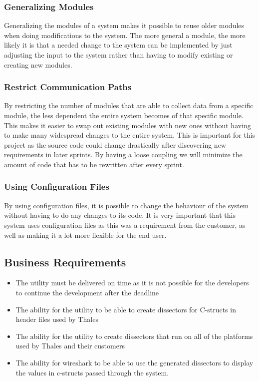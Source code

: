\subsubsection{Generalizing Modules}
Generalizing the modules of a system makes it possible to reuse older modules when doing modifications to the system. The more general a module, the more likely it is that a needed change to the system can be implemented by just adjusting the input to the system rather than having to modify existing or creating new modules.

\subsubsection{Restrict Communication Paths}
By restricting the number of modules that are able to collect data from a specific module, the less dependent the entire system becomes of that specific module. This makes it easier to swap out existing modules with new ones without having to make many widespread changes to the entire system. This is important for this project as the source code could change drastically after discovering new requirements in later sprints. By having a loose coupling we will minimize the amount of code that has to be rewritten after every sprint.

\subsubsection{Using Configuration Files}
By using configuration files, it is possible to change the behaviour of the system without having to do any changes to its code. It is very important that this system uses configuration files as this was a requirement from the customer, as well as making it a lot more flexible for the end user.

\subsection{Business Requirements}
\begin{itemize}
\item The utility must be delivered on time as it is not possible for the developers to continue the development after the deadline
\item The ability for the utility to be able to create dissectors for C-structs in header files used by Thales
\item The ability for the utility to create dissectors that run on all of the platforms used by Thales and their customers
\item The ability for wireshark to be able to use the generated dissectors to display the values in c-structs passed through the system.
\end{itemize}


